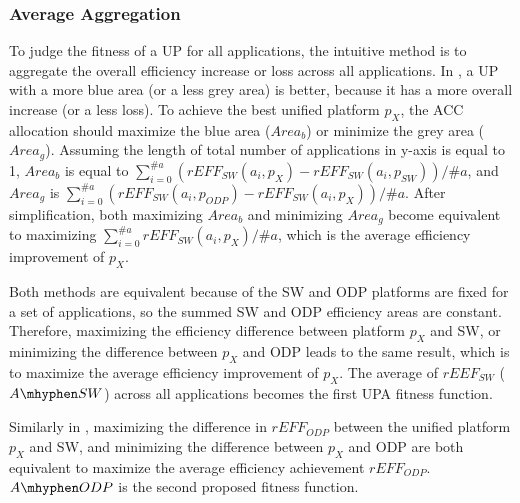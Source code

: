 \subsubsection{Average Aggregation}

To judge the fitness of a UP for all applications, the intuitive method is to aggregate the overall efficiency increase or loss across all applications.
In , a UP with a more blue area (or a less grey area) is better, because it has a more overall increase (or a less loss). 
To achieve the best unified platform $p_{X}$, the ACC allocation should maximize the blue area ($Area_{b}$) or minimize the grey area ($Area_{g}$). 
Assuming the length of total number of applications in y-axis is equal to 1, 
$Area_{b}$ is equal to $\sum_{i=0}^{\#a} ( rEFF_{SW}(a_{i}, p_{X}) -  rEFF_{SW}(a_{i}, p_{SW}) ) / \#a $, and $Area_{g}$ is $\sum_{i=0}^{\#a} ( rEFF_{SW}(a_{i}, p_{ODP}) -  rEFF_{SW}(a_{i}, p_{X}) ) / \#a $.
After simplification, both maximizing $Area_b$ and minimizing $Area_g$ become equivalent to maximizing $\sum_{i=0}^{\#a} rEFF_{SW}(a_{i}, p_{X}) / \#a$, which is the average efficiency improvement of $p_{X}$.  

Both methods are equivalent because of the SW and ODP platforms are fixed for a set of applications, so the summed SW and ODP efficiency areas are constant. 
Therefore, maximizing the efficiency difference between platform $p_{X}$ and SW, or minimizing the difference between $p_{X}$ and ODP leads to the same result, which is to maximize the average efficiency improvement of $p_{X}$. 
The average of $rEEF_{SW}$ ($A \mhyphen SW$) across all applications becomes the first UPA fitness function.


Similarly in , maximizing the difference in $rEFF_{ODP}$ between the unified platform $p_{X}$ and SW, and minimizing the difference between $p_{X}$ and ODP are both equivalent to maximize the average efficiency achievement $rEFF_{ODP}$. $A \mhyphen ODP$ is the second proposed fitness function.